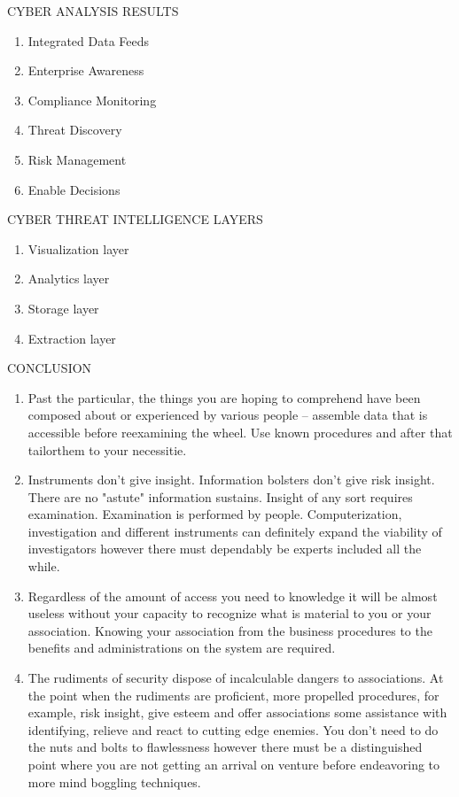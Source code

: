 \documentclass{article}
\begin{document}
CYBER ANALYSIS RESULTS

\begin{enumerate}
\item Integrated Data Feeds
\item Enterprise Awareness
\item Compliance Monitoring
\item Threat Discovery
\item Risk Management
\item Enable Decisions
\end{enumerate}

CYBER THREAT INTELLIGENCE LAYERS
\begin{enumerate}
\item Visualization layer
\item Analytics layer
\item Storage layer
\item Extraction layer
\end{enumerate}

CONCLUSION

\begin{enumerate}
\item Past the particular, the things you are hoping to comprehend have been composed about or experienced by various people – assemble data that is accessible before reexamining the wheel. Use known procedures and after that tailorthem to your necessitie.
\item Instruments don't give insight. Information bolsters don't give risk insight. There are no "astute" information sustains. Insight of any sort requires examination. Examination is performed by people. Computerization, investigation and different instruments can definitely expand the viability of investigators however there must dependably be experts included all the while.
\item Regardless of the amount of access you need to knowledge it will be almost useless without your capacity to recognize what is material to you or your association. Knowing your association from the business procedures to the benefits and administrations on the system are required.
\item The rudiments of security dispose of incalculable dangers to associations. At the point when the rudiments are proficient, more propelled procedures, for example, risk insight, give esteem and offer associations some assistance with identifying, relieve and react to cutting edge enemies. You don't need to do the nuts and bolts to flawlessness however there must be a distinguished point where you are not getting an arrival on venture before endeavoring to more mind boggling techniques.
\end{enumerate}
\end{document}
